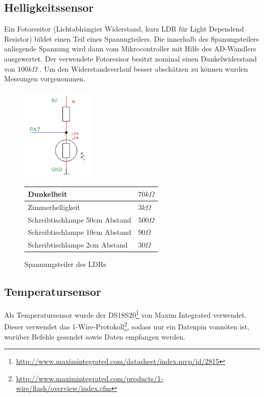 \subsection{Helligkeitssensor}
Ein Fotoresitor (Lichtabhängier Widerstand, kurz LDR für Light Dependend Resistor) bildet einen Teil eines Spannugteilers. Die innerhalb des Spanungsteilers anliegende Spannung wird dann vom Mikrocontroller mit Hilfe des AD-Wandlers ausgewertet.
Der verwendete Fotoresisor besitzt nominal einen Dunkelwiderstand von $100 k\Omega$ .
Um den Widerstandsverlauf besser abschätzen zu können wurden Messungen vorgenommen.
\begin{figure}[h]
  \begin{center}
  \begin{minipage}[b]{0.3\textwidth}
        \includegraphics[height=4.5cm]{skizzen/helligkeitssensor_schmatic.png}
        \caption{Spannungsteiler des LDRs}
  \end{minipage}
  \hspace{0.07\textwidth} 
  \begin{minipage}[b]{0.6\textwidth}
    \begin{tabular}[h]{||l | l||}
	  \hline \hline
	  Dunkelheit& $70 k\Omega$ \\ \hline
	  Zimmerhelligkeit & $3 k\Omega$ \\ \hline
	  Schreibtischlampe 50cm Abstand& $500 \Omega$ \\ \hline
	  Schreibtischlampe 10cm Abstand& $90 \Omega$ \\ \hline
	  Schreibtischlampe 2cm Abstand& $30 \Omega$  \\
	  \hline\hline
    \end{tabular} 
    \label{Modellversuch} 
  \end{minipage}
  \end{center}
\end{figure}
%
\subsection{Temperatursensor}
Als Temperatursensor wurde der DS18S20\footnote{\url{http://www.maximintegrated.com/datasheet/index.mvp/id/2815}} von Maxim Integrated verwendet. Dieser verwendet das 1-Wire\textsuperscript{\textregistered}-Protokoll\footnote{\url{http://www.maximintegrated.com/products/1-wire/flash/overview/index.cfm}}, sodass nur ein Datenpin vonnöten ist, worüber Befehle gesendet sowie Daten empfangen werden.

